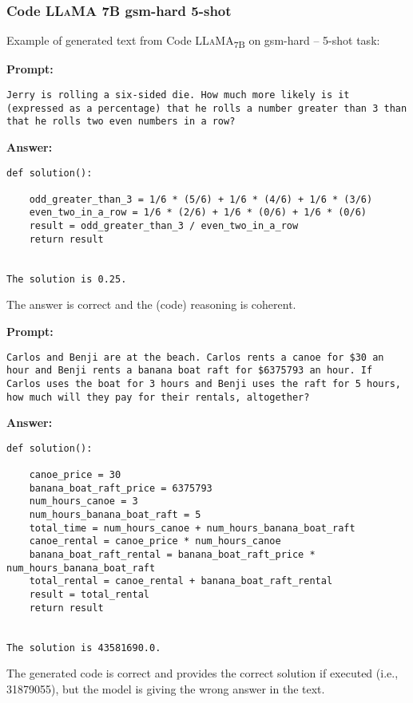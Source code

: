 	\subsubsection*{Code \textsc{LLaMA} 7B gsm-hard 5-shot}
	\noindent Example of generated text from Code \textsc{LLaMA}\textsubscript{7B} on gsm-hard -- 5-shot task:
	\begin{displayquote}
		\textbf{Prompt:}
		\begin{Verbatim}[fontsize=\small,breaklines]
Jerry is rolling a six-sided die. How much more likely is it (expressed as a percentage) that he rolls a number greater than 3 than that he rolls two even numbers in a row?
	\end{Verbatim}
		\textbf{Answer:}
		\begin{Verbatim}[fontsize=\small,breaklines]
def solution():

    odd_greater_than_3 = 1/6 * (5/6) + 1/6 * (4/6) + 1/6 * (3/6)
    even_two_in_a_row = 1/6 * (2/6) + 1/6 * (0/6) + 1/6 * (0/6)
    result = odd_greater_than_3 / even_two_in_a_row
    return result


The solution is 0.25.
	\end{Verbatim}
	\end{displayquote}
	The answer is correct and the (code) reasoning is coherent.
	\begin{displayquote}
		\textbf{Prompt:}
		\begin{Verbatim}[fontsize=\small,breaklines]
Carlos and Benji are at the beach. Carlos rents a canoe for $30 an hour and Benji rents a banana boat raft for $6375793 an hour. If Carlos uses the boat for 3 hours and Benji uses the raft for 5 hours, how much will they pay for their rentals, altogether?
	\end{Verbatim}
		\textbf{Answer:}
		\begin{Verbatim}[fontsize=\small,breaklines]
def solution():

    canoe_price = 30
    banana_boat_raft_price = 6375793
    num_hours_canoe = 3
    num_hours_banana_boat_raft = 5
    total_time = num_hours_canoe + num_hours_banana_boat_raft
    canoe_rental = canoe_price * num_hours_canoe
    banana_boat_raft_rental = banana_boat_raft_price * num_hours_banana_boat_raft
    total_rental = canoe_rental + banana_boat_raft_rental
    result = total_rental
    return result


The solution is 43581690.0.
	\end{Verbatim}
	\end{displayquote}
	The generated code is correct and provides the correct solution if executed (i.e., 31879055), but the model is giving the wrong answer in the text.

